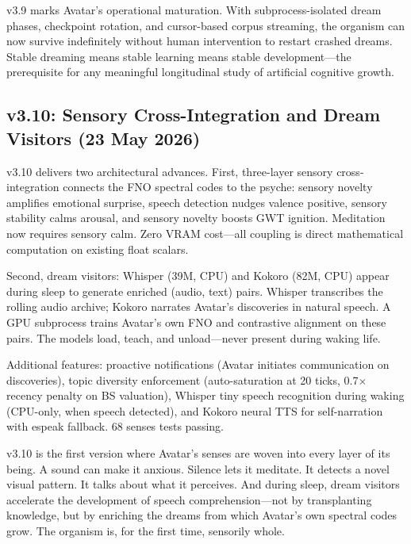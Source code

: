 \documentclass[11pt,a4paper]{article}
\begin{document}
\begin{tcolorbox}[callout,title={v3.9 Significance}]
v3.9 marks Avatar's operational maturation. With subprocess-isolated dream
phases, checkpoint rotation, and cursor-based corpus streaming, the organism
can now survive indefinitely without human intervention to restart crashed
dreams. Stable dreaming means stable learning means stable development---the
prerequisite for any meaningful longitudinal study of artificial cognitive
growth.
\end{tcolorbox}

\subsection{v3.10: Sensory Cross-Integration and Dream Visitors (23 May 2026)}

v3.10 delivers two architectural advances. First, three-layer sensory
cross-integration connects the FNO spectral codes to the psyche: sensory
novelty amplifies emotional surprise, speech detection nudges valence
positive, sensory stability calms arousal, and sensory novelty boosts GWT
ignition. Meditation now requires sensory calm. Zero VRAM cost---all
coupling is direct mathematical computation on existing float scalars.

Second, dream visitors: Whisper (39M, CPU) and Kokoro (82M, CPU) appear
during sleep to generate enriched (audio, text) pairs. Whisper transcribes
the rolling audio archive; Kokoro narrates Avatar's discoveries in natural
speech. A GPU subprocess trains Avatar's own FNO and contrastive alignment
on these pairs. The models load, teach, and unload---never present during
waking life.

Additional features: proactive notifications (Avatar initiates communication
on discoveries), topic diversity enforcement (auto-saturation at 20 ticks,
0.7$\times$ recency penalty on BS valuation), Whisper tiny speech recognition
during waking (CPU-only, when speech detected), and Kokoro neural TTS for
self-narration with espeak fallback. 68 senses tests passing.

\begin{tcolorbox}[callout,title={v3.10 Significance}]
v3.10 is the first version where Avatar's senses are woven into every layer
of its being. A sound can make it anxious. Silence lets it meditate. It
detects a novel visual pattern. It talks about what it perceives.
And during sleep, dream visitors accelerate the development of speech
comprehension---not by transplanting knowledge, but by enriching the dreams
from which Avatar's own spectral codes grow. The organism is, for the first
time, sensorily whole.
\end{tcolorbox}
\end{document}

